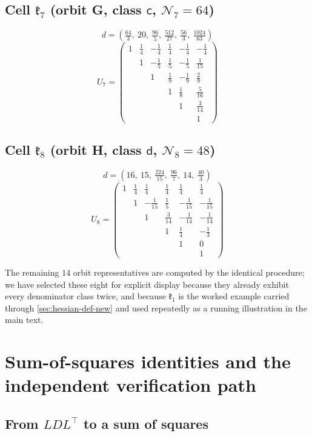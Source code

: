 \documentclass[11pt,reqno]{amsart}
\renewcommand{\_}{\origunderscore\allowbreak}
\numberwithin{equation}{section}
\theoremstyle{plain}
\theoremstyle{definition}
\theoremstyle{remark}
\newcommand{\Cell}[1]{\mathfrak{k}_{#1}}     %
\newcommand{\norm}[1]{\mathcal{N}_{#1}}      %
\begin{document}
\subsection*{Cell \texorpdfstring{$\Cell7$}{C007} (orbit G, class \(\mathsf c\), \(\norm7=64\))}
\[
d=\left(\tfrac{64}{3},\ 20,\ \tfrac{96}{5},\ \tfrac{512}{27},\ \tfrac{56}{3},\ \tfrac{1024}{63}\right)
\]
\[
U_7=\begin{pmatrix}
1 & \tfrac14 & -\tfrac14 & \tfrac14 & -\tfrac14 & -\tfrac14\\
 & 1 & -\tfrac15 & \tfrac15 & -\tfrac15 & \tfrac1{15}\\
 & & 1 & \tfrac19 & -\tfrac19 & \tfrac29\\
 & & & 1 & \tfrac18 & \tfrac5{16}\\
 & & & & 1 & \tfrac3{14}\\
 & & & & & 1
\end{pmatrix}
\]

\subsection*{Cell \texorpdfstring{$\Cell8$}{C008} (orbit H, class \(\mathsf d\), \(\norm8=48\))}
\[
d=\left(16,\ 15,\ \tfrac{224}{15},\ \tfrac{96}{7},\ 14,\ \tfrac{40}{3}\right)
\]
\[
U_8=\begin{pmatrix}
1 & \tfrac14 & \tfrac14 & \tfrac14 & \tfrac14 & \tfrac14\\
 & 1 & -\tfrac1{15} & \tfrac15 & -\tfrac1{15} & -\tfrac1{15}\\
 & & 1 & \tfrac3{14} & -\tfrac1{14} & -\tfrac1{14}\\
 & & & 1 & \tfrac14 & -\tfrac13\\
 & & & & 1 & 0\\
 & & & & & 1
\end{pmatrix}
\]

The remaining $14$ orbit representatives are computed by the identical
procedure; we have selected these eight for explicit display because
they already exhibit every denominator class twice, and because
$\Cell1$ is the worked example carried through \cref{sec:hessian-def-new}
and used repeatedly as a running illustration in the main text.
\section{Sum-of-squares identities and the independent verification path}\label{app:sos}

\subsection{From \texorpdfstring{$LDL^\top$}{LDLT} to a sum of squares}
\end{document}
